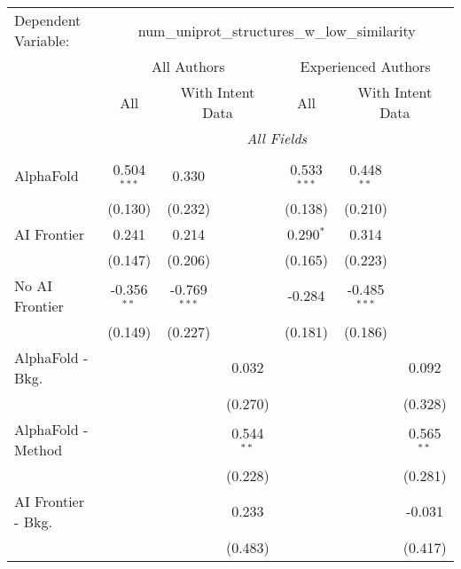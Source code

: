 \begingroup
\centering
\begin{tabular}{lcccccc}
   \tabularnewline \midrule \midrule
   Dependent Variable: & \multicolumn{6}{c}{num\_uniprot\_structures\_w\_low\_similarity}\\
 & \multicolumn{3}{c}{All Authors} & \multicolumn{3}{c}{Experienced Authors} \\
\cmidrule(lr){2-4} \cmidrule(lr){5-7}
 & \multicolumn{1}{c}{All} & \multicolumn{2}{c}{With Intent Data} & \multicolumn{1}{c}{All} & \multicolumn{2}{c}{With Intent Data} \\
\cmidrule(lr){2-2} \cmidrule(lr){3-4} \cmidrule(lr){5-5} \cmidrule(lr){6-7}
 & \multicolumn{6}{c}{\textit{All Fields}} \\ \\
   AlphaFold               & 0.504$^{***}$ & 0.330          &               & 0.533$^{***}$ & 0.448$^{**}$   &   \\   
                           & (0.130)       & (0.232)        &               & (0.138)       & (0.210)        &   \\   
   AI Frontier             & 0.241         & 0.214          &               & 0.290$^{*}$   & 0.314          &   \\   
                           & (0.147)       & (0.206)        &               & (0.165)       & (0.223)        &   \\   
   No AI Frontier          & -0.356$^{**}$ & -0.769$^{***}$ &               & -0.284        & -0.485$^{***}$ &   \\   
                           & (0.149)       & (0.227)        &               & (0.181)       & (0.186)        &   \\   
   AlphaFold - Bkg.        &               &                & 0.032         &               &                & 0.092\\   
                           &               &                & (0.270)       &               &                & (0.328)\\   
   AlphaFold - Method      &               &                & 0.544$^{**}$  &               &                & 0.565$^{**}$\\   
                           &               &                & (0.228)       &               &                & (0.281)\\   
   AI Frontier - Bkg.      &               &                & 0.233         &               &                & -0.031\\   
                           &               &                & (0.483)       &               &                & (0.417)\\   

\end{tabular}
